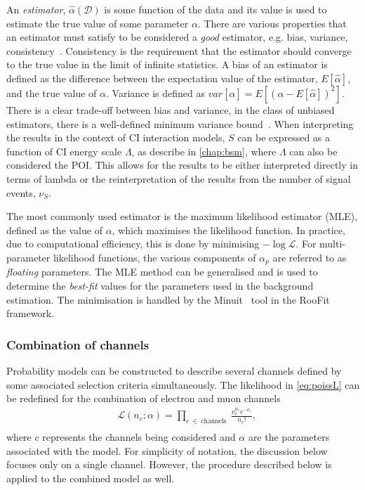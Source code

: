 An \emph{estimator}, $\hat{\alpha}(\mathcal{D})$ is some function of the data and its value is used to estimate the true value of some parameter $\alpha$. There are various properties that an estimator must satisfy to be considered a \emph{good} estimator, e.g. bias, variance, consistency~\cite{errorsOnNumbers}. Consistency is the requirement that the estimator should converge to the true value in the limit of infinite statistics. A bias of an estimator is defined as the difference between the expectation value of the estimator, $E[\hat{\alpha}]$, and the true value of $\alpha$. Variance is defined as $var[\hat{\alpha}] = E\left[(\alpha - E[\hat{\alpha}])^{2}\right]$. There is a clear trade-off between bias and variance, in the class of unbiased estimators, there is a well-defined minimum variance bound~\cite{Cranmer:2015nia}. When interpreting the results in the context of CI interaction models, $S$ can be expressed as a function of CI energy scale $\Lambda$, as describe in \cref{chap:bsm}, where $\Lambda$ can also be considered the POI. This allows for the results to be either interpreted directly in terms of lambda or the reinterpretation of the results from  the number of signal events, $\nu_S$.

The most commonly used estimator is the maximum likelihood estimator (MLE), defined as the value of $\alpha$, which maximises the likelihood function. In practice, due to computational efficiency, this is done by minimising $-\log\mathcal{L}$. For multi-parameter likelihood functions, the various components of $\alpha_p$ are referred to as \emph{floating} parameters. The MLE method can be generalised and is used to determine the \emph{best-fit} values for the parameters used in the background estimation. The minimisation is handled by the Minuit~\cite{James:873119} tool in the RooFit framework.

\subsubsection{Combination of channels}
Probability models can be constructed to describe several channels defined by some associated selection criteria simultaneously. The likelihood in \cref{eq:poissL} can be redefined for the combination of electron and muon channels 
\begin{equation}
    \label{eq:poissLcomb}
    \begin{aligned}
        & \mathcal{L}(n_c;\alpha) = \prod_{\mathrm{c}~\in~\mathrm{channels}}~\frac{\nu_{c}^{n_{c}} e^{-\nu_{c}}}{n_{c}!}, \\
    \end{aligned}
\end{equation}
where $c$ represents the channels being considered and $\alpha$ are the parameters associated with the model. For simplicity of notation, the discussion below focuses only on a single channel. However, the procedure described below is applied to the combined model as well. 

